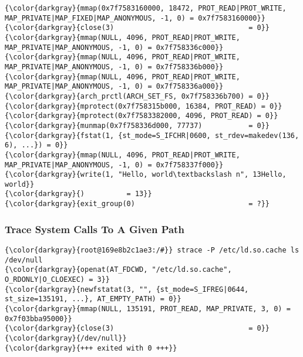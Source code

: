 {{\begin{Verbatim}[commandchars=\\\{\}]
{\color{darkgray}{mmap(0x7f7583160000, 18472, PROT_READ|PROT_WRITE, MAP_PRIVATE|MAP_FIXED|MAP_ANONYMOUS, -1, 0) = 0x7f7583160000}}
{\color{darkgray}{close(3)                                = 0}}
{\color{darkgray}{mmap(NULL, 4096, PROT_READ|PROT_WRITE, MAP_PRIVATE|MAP_ANONYMOUS, -1, 0) = 0x7f758336c000}}
{\color{darkgray}{mmap(NULL, 4096, PROT_READ|PROT_WRITE, MAP_PRIVATE|MAP_ANONYMOUS, -1, 0) = 0x7f758336b000}}
{\color{darkgray}{mmap(NULL, 4096, PROT_READ|PROT_WRITE, MAP_PRIVATE|MAP_ANONYMOUS, -1, 0) = 0x7f758336a000}}
{\color{darkgray}{arch_prctl(ARCH_SET_FS, 0x7f758336b700) = 0}}
{\color{darkgray}{mprotect(0x7f758315b000, 16384, PROT_READ) = 0}}
{\color{darkgray}{mprotect(0x7f7583382000, 4096, PROT_READ) = 0}}
{\color{darkgray}{munmap(0x7f758336d000, 77737)           = 0}}
{\color{darkgray}{fstat(1, {st_mode=S_IFCHR|0600, st_rdev=makedev(136, 6), ...}) = 0}}
{\color{darkgray}{mmap(NULL, 4096, PROT_READ|PROT_WRITE, MAP_PRIVATE|MAP_ANONYMOUS, -1, 0) = 0x7f758337f000}}
{\color{darkgray}{write(1, "Hello, world\textbackslash n", 13Hello, world}}
{\color{darkgray}{)          = 13}}
{\color{darkgray}{exit_group(0)                           = ?}}
\end{Verbatim}



		\subsubsection{Trace System Calls To A Given Path}
{\footnotesize{
\begin{Verbatim}[commandchars=\\\{\}]
{\color{darkgray}{root@169e8b2c1ae3:/#}} strace -P /etc/ld.so.cache ls /dev/null 
{\color{darkgray}{openat(AT_FDCWD, "/etc/ld.so.cache", O_RDONLY|O_CLOEXEC) = 3}}
{\color{darkgray}{newfstatat(3, "", {st_mode=S_IFREG|0644, st_size=135191, ...}, AT_EMPTY_PATH) = 0}}
{\color{darkgray}{mmap(NULL, 135191, PROT_READ, MAP_PRIVATE, 3, 0) = 0x7f03bba95000}}
{\color{darkgray}{close(3)                                = 0}}
{\color{darkgray}{/dev/null}}
{\color{darkgray}{+++ exited with 0 +++}}
\end{Verbatim}
}}


}}

